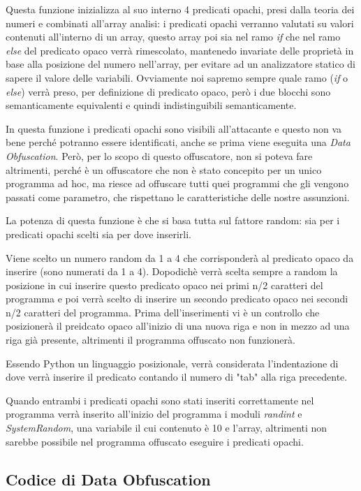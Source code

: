 \documentclass[a4paper,oneside,openright,titlepage,10pt,footinclude,headinclude]{scrbook}
\begin{document}
Questa funzione inizializza al suo interno 4 predicati opachi, presi dalla teoria dei numeri e combinati all'array analisi: i predicati opachi verranno valutati su valori contenuti all'interno di un array, questo array poi sia nel ramo \textit{if} che nel ramo \textit{else} del predicato opaco verrà rimescolato, mantenedo invariate delle proprietà in base alla posizione del numero nell'array, per evitare ad un analizzatore statico di sapere il valore delle variabili. Ovviamente noi sapremo sempre quale ramo (\textit{if} o \textit{else}) verrà preso, per definizione di predicato opaco, però i due blocchi sono semanticamente equivalenti e quindi indistinguibili semanticamente. 

In questa funzione i predicati opachi sono visibili all'attacante e questo non va bene perché potranno essere identificati, anche se prima viene eseguita una \textit{Data Obfuscation}. Però, per lo scopo di questo offuscatore, non si poteva fare altrimenti, perché è un offuscatore che non è stato concepito per un unico programma ad hoc, ma riesce ad offuscare tutti quei programmi che gli vengono passati come parametro, che rispettano le caratteristiche delle nostre assunzioni.

La potenza di questa funzione è che si basa tutta sul fattore random: sia per i predicati opachi scelti sia per dove inserirli.

Viene scelto un numero random da 1 a 4 che corrisponderà al predicato opaco da inserire (sono numerati da 1 a 4). Dopodichè verrà scelta sempre a random la posizione in cui inserire questo predicato opaco nei primi n/2 caratteri del programma e poi verrà scelto di inserire un secondo predicato opaco nei secondi n/2 caratteri del programma. Prima dell'inserimenti vi è un controllo che posizionerà il preidcato opaco all'inizio di una nuova riga e non in mezzo ad una riga già presente, altrimenti il programma offuscato non funzionerà.

Essendo Python un linguaggio posizionale, verrà considerata l'indentazione di dove verrà inserire il predicato contando il numero di "tab" alla riga precedente. 

Quando entrambi i predicati opachi sono stati inseriti correttamente nel programma verrà inserito all'inizio del programma i moduli \textit{randint} e \textit{SystemRandom}, una variabile il cui contenuto è 10 e l'array, altrimenti non sarebbe possibile nel programma offuscato eseguire i predicati opachi.

\subsection{Codice di Data Obfuscation}
\end{document}
